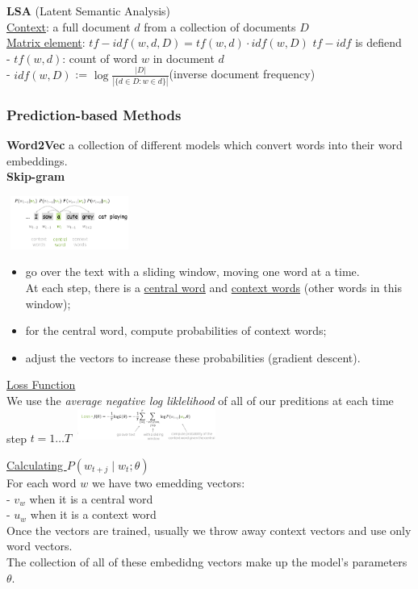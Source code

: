 \documentclass[8pt]{extarticle} %
\begin{document}
\begin{multicols*}{3}
\textbf{LSA} (Latent Semantic Analysis)\\ 
\underline{Context}: a full document $d$ from a collection of documents $D$\\
\underline{Matrix element}: $tf-idf(w, d, D) = tf(w, d) \cdot idf(w, D)$
$tf-idf$ is defiend\\
- $tf(w, d)$: count of word $w$ in document $d$\\
- $idf(w, D)$ := $\log \frac{|D|}{|\{d \in D: w \in d\}|}$(inverse document frequency)\\

\subsubsection*{Prediction-based Methods}
\textbf{Word2Vec} a collection of different models which convert words into their word embeddings. \\

\textbf{Skip-gram} 
\begin{center}
    \includegraphics[width=0.3\textwidth]{media/skipgram.png}
\end{center}
\begin{itemize}
    \item go over the text with a sliding window, moving one word at a time.\\
    At each step, there is a \underline{central word} and \underline{context words} (other words in this window);
    \item for the central word, compute probabilities of context words;
    \item adjust the vectors to increase these probabilities (gradient descent).
\end{itemize}
\underline{Loss Function}\\

We use the \textit{ average negative log liklelihood} of all of our preditions at each time step $t= 1\dots T$
\includegraphics[width=0.35\textwidth]{media/skigram-loss.png}

\underline{Calculating $P(w_{t+j}\mid w_t;\theta)$}\\
For each word $w$ we have two emedding vectors:\\
- $v_w$ when it is a central word\\
- $u_w$ when it is a context word\\
Once the vectors are trained, usually we throw away context vectors and use only word vectors.\\
The collection of all of these embedidng vectors make up the model's parameters $\theta$.\\


\end{multicols*}
\end{document}
